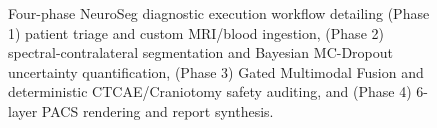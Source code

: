 \documentclass[journal,onecolumn,10pt]{IEEEtran}
\begin{document}
\begin{figure}[t]
\caption{Four-phase NeuroSeg diagnostic execution workflow detailing (Phase 1) patient triage and custom MRI/blood ingestion, (Phase 2) spectral-contralateral segmentation and Bayesian MC-Dropout uncertainty quantification, (Phase 3) Gated Multimodal Fusion and deterministic CTCAE/Craniotomy safety auditing, and (Phase 4) 6-layer PACS rendering and report synthesis.}
\label{fig:workflow}
\end{figure}
\end{document}
